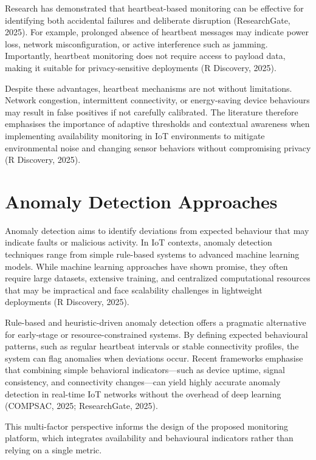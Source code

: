 Research has demonstrated that heartbeat-based monitoring can be effective for identifying both accidental failures and deliberate disruption (ResearchGate, 2025). For example, prolonged absence of heartbeat messages may indicate power loss, network misconfiguration, or active interference such as jamming. Importantly, heartbeat monitoring does not require access to payload data, making it suitable for privacy-sensitive deployments (R Discovery, 2025).

Despite these advantages, heartbeat mechanisms are not without limitations. Network congestion, intermittent connectivity, or energy-saving device behaviours may result in false positives if not carefully calibrated. The literature therefore emphasises the importance of adaptive thresholds and contextual awareness when implementing availability monitoring in IoT environments to mitigate environmental noise and changing sensor behaviors without compromising privacy (R Discovery, 2025).

\section{Anomaly Detection Approaches}

Anomaly detection aims to identify deviations from expected behaviour that may indicate faults or malicious activity. In IoT contexts, anomaly detection techniques range from simple rule-based systems to advanced machine learning models. While machine learning approaches have shown promise, they often require large datasets, extensive training, and centralized computational resources that may be impractical and face scalability challenges in lightweight deployments (R Discovery, 2025).

Rule-based and heuristic-driven anomaly detection offers a pragmatic alternative for early-stage or resource-constrained systems. By defining expected behavioural patterns, such as regular heartbeat intervals or stable connectivity profiles, the system can flag anomalies when deviations occur. Recent frameworks emphasise that combining simple behavioral indicators---such as device uptime, signal consistency, and connectivity changes---can yield highly accurate anomaly detection in real-time IoT networks without the overhead of deep learning (COMPSAC, 2025; ResearchGate, 2025).

This multi-factor perspective informs the design of the proposed monitoring platform, which integrates availability and behavioural indicators rather than relying on a single metric.

